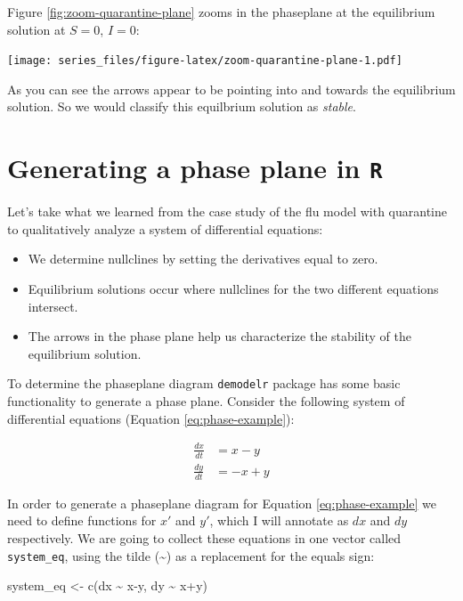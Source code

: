 \documentclass[
]{book}
\newenvironment{Shaded}{\begin{snugshade}}{\end{snugshade}}
\newcommand{\FunctionTok}[1]{\textcolor[rgb]{0.00,0.00,0.00}{#1}}
\newcommand{\NormalTok}[1]{#1}
\newcommand{\OtherTok}[1]{\textcolor[rgb]{0.56,0.35,0.01}{#1}}
\newcommand{\SpecialCharTok}[1]{\textcolor[rgb]{0.00,0.00,0.00}{#1}}
\providecommand{\tightlist}{%
  \setlength{\itemsep}{0pt}\setlength{\parskip}{0pt}}
\theoremstyle{definition}
\theoremstyle{definition}
\theoremstyle{definition}
\theoremstyle{remark}
\begin{document}
Figure \ref{fig:zoom-quarantine-plane} zooms in the phaseplane at the equilibrium solution at \(S=0\), \(I=0\):

\texttt{[image: series\_files/figure-latex/zoom-quarantine-plane-1.pdf]}

As you can see the arrows appear to be pointing into and towards the equilibrium solution. So we would classify this equilbrium solution as \emph{stable}.

\hypertarget{generating-a-phase-plane-in-r}{%
\section{\texorpdfstring{Generating a phase plane in \texttt{R}}{Generating a phase plane in R}}\label{generating-a-phase-plane-in-r}}

Let's take what we learned from the case study of the flu model with quarantine to qualitatively analyze a system of differential equations:

\begin{itemize}
\tightlist
\item
  We determine nullclines by setting the derivatives equal to zero.
\item
  Equilibrium solutions occur where nullclines for the two different equations intersect.
\item
  The arrows in the phase plane help us characterize the stability of the equilibrium solution.
\end{itemize}

To determine the phaseplane diagram \texttt{demodelr} package has some basic functionality to generate a phase plane. Consider the following system of differential equations (Equation \eqref{eq:phase-example}):

\begin{equation}
\begin{split}\label{eq:phase-example}
\frac{dx}{dt} &= x-y \\
\frac{dy}{dt} &= -x+y
\end{split}
\end{equation}

In order to generate a phaseplane diagram for Equation \eqref{eq:phase-example} we need to define functions for \(x'\) and \(y'\), which I will annotate as \(dx\) and \(dy\) respectively. We are going to collect these equations in one vector called \texttt{system\_eq}, using the tilde (\textasciitilde) as a replacement for the equals sign:

\begin{Shaded}
\begin{Highlighting}[]
\NormalTok{system\_eq }\OtherTok{\textless{}{-}} \FunctionTok{c}\NormalTok{(dx }\SpecialCharTok{\textasciitilde{}}\NormalTok{ x}\SpecialCharTok{{-}}\NormalTok{y,}
\NormalTok{               dy }\SpecialCharTok{\textasciitilde{}}\NormalTok{ x}\SpecialCharTok{+}\NormalTok{y)}
\end{Highlighting}
\end{Shaded}
\end{document}
